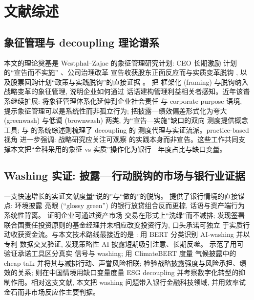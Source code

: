 \section{文献综述}\label{sec:lit}

\subsection{象征管理与 decoupling 理论谱系}

本文的理论奠基是 Westphal--Zajac 的象征管理研究计划: CEO 长期激励
计划的``宣告而不实施'' \parencite{westphal1994substance}、公司治理改革
宣告收获股东正面反应而与实质变革脱钩 \parencite{westphal1998sym},
以及股票回购计划``政策与实践脱钩''的直接证据
\parencite{westphal2001decoupling}。\textcite{fisszajac2006symbolic} 把
框架化 (framing) 与脱钩纳入战略变革的象征管理, 说明企业如何通过
话语建构管理利益相关者感知。近年该谱系继续扩展:
\textcite{westphal2023systemic} 将象征管理体系化延伸到企业社会责任
与 corporate purpose 语境, 提示象征管理可以是系统性而非孤立行为;
\textcite{kimlyon2015greenwash} 把披露—绩效偏差形式化为夸大
(greenwash) 与低调 (brownwash) 两类, 为``宣告—实施''缺口的双向
测度提供概念工具; \textcite{velte2023decoupling} 与
\textcite{cepeda2025decoupling} 的系统综述则梳理了 decoupling 的
测度代理与实证流派。practice-based 视角
\parencite{bromiley2014practice} 进一步强调: 战略研究应关注可观察
的实践本身而非宣告。这些工作共同支撑本文把``金科采用的象征 vs
实质''操作化为银行—年度占比与缺口变量。

\subsection{Washing 实证: 披露—行动脱钩的市场与银行业证据}

一支快速增长的实证文献度量``说的''与``做的''的脱钩。
\textcite{giannetti2026glossy} 提供了银行情境的直接锚点: 环境披露
亮眼 (``glossy green'') 的银行放贷组合反而更棕, 话语与资产端行为
系统性背离。\textcite{duchin2025greenwash} 证明企业可通过资产市场
交易在形式上``洗绿''而不减排; \textcite{kimyoon2023pri} 发现签署
联合国责任投资原则的基金经理并未相应改变投资行为, 口头承诺可独立
于实质行动收获资金流。与本文技术路线最接近的是
\textcite{song2026aiwashing}: 用 BERT 分类识别 AI-washing 并以专利
数据交叉验证, 发现策略性 AI 披露短期吸引注意、长期反噬。
\textcite{flammer2021greenbonds} 示范了用可验证承诺工具区分真实
信号与 washing; \textcite{bingler2024cheaptalk} 用 ClimateBERT 度量
气候披露中的 cheap talk 并将其与减排行动、声誉风险相联;
\textcite{cai2025cheaptalk} 检验战略披露强度与风险承担、绩效的关系;
\textcite{chen2024esgdecoupling} 则在中国情境用缺口变量度量 ESG
decoupling 并考察数字化转型的抑制作用。相对这支文献, 本文把 washing
问题带入银行金融科技领域, 并用效率试金石而非市场反应作主要判据。

